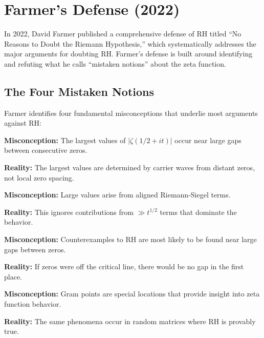 \section{Farmer's Defense (2022)}
\label{sec:farmer_defense}

In 2022, David Farmer published \cite{farmer2022} a comprehensive defense of RH titled ``No Reasons to Doubt the Riemann Hypothesis,'' which systematically addresses the major arguments for doubting RH. Farmer's defense is built around identifying and refuting what he calls ``mistaken notions'' about the zeta function.

\subsection{The Four Mistaken Notions}
\label{subsec:mistaken_notions}

Farmer identifies four fundamental misconceptions that underlie most arguments against RH:

\begin{theorem}
\textbf{Misconception:} The largest values of $|\zeta(1/2 + it)|$ occur near large gaps between consecutive zeros.

\textbf{Reality:} The largest values are determined by carrier waves from distant zeros, not local zero spacing.
\end{theorem}

\begin{theorem} 
\textbf{Misconception:} Large values arise from aligned Riemann-Siegel terms.

\textbf{Reality:} This ignores contributions from $\gg t^{1/2}$ terms that dominate the behavior.
\end{theorem}

\begin{theorem}
\textbf{Misconception:} Counterexamples to RH are most likely to be found near large gaps between zeros.

\textbf{Reality:} If zeros were off the critical line, there would be no gap in the first place.
\end{theorem}

\begin{theorem}
\textbf{Misconception:} Gram points are special locations that provide insight into zeta function behavior.

\textbf{Reality:} The same phenomena occur in random matrices where RH is provably true.
\end{theorem}

